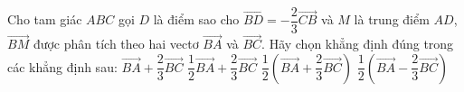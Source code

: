\documentclass[12pt,a4paper,openany,oneside]{book}
\begin{document}
\begin{ex}%
	Cho tam giác $ABC$ gọi $D$ là điểm sao cho $\overrightarrow{BD}=-\dfrac{2}{3}\overrightarrow{CB}$ và $M$ là trung điểm  $AD$, $\overrightarrow{BM}$ được phân tích theo hai vectơ $\overrightarrow{BA}$ và $\overrightarrow{BC}$. Hãy chọn khẳng định đúng trong các khẳng định sau:
	\choice 
		{$\overrightarrow{BA}+\dfrac{2}{3}\overrightarrow{BC}$} 
		 {$\dfrac{1}{2}\overrightarrow{BA}+\dfrac{2}{3}\overrightarrow{BC}$}
		{\True  $\dfrac{1}{2}\left(\overrightarrow{BA}+\dfrac{2}{3}\overrightarrow{BC}\right)$} 
		{$\dfrac{1}{2}\left(\overrightarrow{BA}-\dfrac{2}{3}\overrightarrow{BC}\right)$}
\end{ex}
\end{document}
